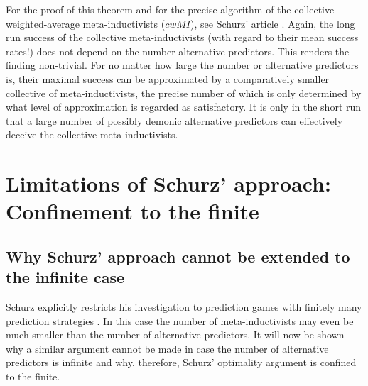\documentclass[12pt, a4paper]{article}
\numberwithin{equation}{section}
\begin{document}
For the proof of this theorem and for the precise algorithm of the
collective weighted-average meta-inductivists ($cwMI$), see Schurz'
article \cite[p. 297-299]{schurz:2008}. Again, the long run success of
the collective meta-inductivists (with regard to their mean success
rates!) does not depend on the number alternative predictors. This
renders the finding non-trivial. For no matter how large the number or
alternative predictors is, their maximal success can be approximated by a
comparatively smaller collective of meta-inductivists, the precise number
of which is only determined by what level of approximation is regarded as
satisfactory. It is only in the short run that a large number of possibly
demonic alternative predictors can effectively deceive the collective
meta-inductivists.

\section{Limitations of Schurz' approach: Confinement to the finite}

\subsection{Why Schurz' approach cannot be extended to the infinite case}
\label{finiteness}

Schurz explicitly restricts his investigation to prediction games with finitely
many prediction strategies \cite[p. 284]{schurz:2008}.  In this case the number
of meta-inductivists may even be much smaller than the number of alternative
predictors. It will now be shown why a similar argument cannot be
made in case the number of alternative predictors is infinite and why, therefore,
Schurz' optimality argument is confined to the finite. 
\end{document}
